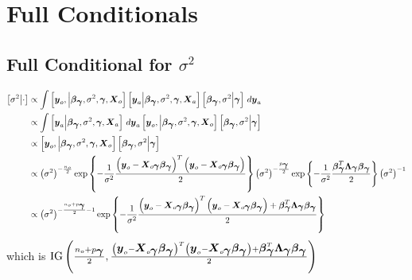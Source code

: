 \documentclass[fleqn]{article}
\def\bm#1{\mbox{\boldmath $#1$}}
\begin{document}
\section{Full Conditionals}
\subsection{Full Conditional for $\sigma^2$}
%
\begin{align*}
%
\left[ \sigma^2 \middle| \cdot \right] & \propto \int \left[ \bm{y}_o, \middle| \bm{\beta}_{\bm{\gamma}}, \sigma^2, \bm{\gamma}, \bm{X}_o \right] \left[ \bm{y}_a \middle| \bm{\beta}_{\bm{\gamma}}, \sigma^2, \bm{\gamma}, \bm{X}_a \right] \left[ \bm{\beta}_{\bm{\gamma}}, \sigma^2 \middle| \bm{\gamma} \right] \, d \bm{y}_a\\
%
 & \propto \int \left[ \bm{y}_a \middle| \bm{\beta}_{\bm{\gamma}}, \sigma^2, \bm{\gamma}, \bm{X}_a \right] \, d \bm{y}_a \left[ \bm{y}_o, \middle| \bm{\beta}_{\bm{\gamma}}, \sigma^2, \bm{\gamma}, \bm{X}_o \right] \left[ \bm{\beta}_{\bm{\gamma}}, \sigma^2 \middle| \bm{\gamma} \right] \\
%
 & \propto \left[ \bm{y}_o, \middle| \bm{\beta}_{\bm{\gamma}}, \sigma^2, \bm{\gamma}, \bm{X}_o \right] \left[ \bm{\beta}_{\bm{\gamma}}, \sigma^2 \middle| \bm{\gamma} \right] \\
%
 & \propto \left( \sigma^2 \right)^{ - \frac{n_o} {2}} \exp{\left\{ - \frac{1} {\sigma^2} \frac{ \left( \bm{y}_o - \bm{X}_{o \bm{\gamma}} \bm{\beta}_{\bm{\gamma}} \right)^T \left( \bm{y}_o - \bm{X}_{o \bm{\gamma}} \bm{\beta}_{\bm{\gamma}} \right) } {2} \right\} } \left( \sigma^2 \right)^{ - \frac{p_{\bm{\gamma}}} {2}} \exp{ \left\{ - \frac{1} {\sigma^2} \frac{\bm{\beta}_{\bm{\gamma}}^T \bm{\Lambda}_{\bm{\gamma}} \bm{\beta}_{\bm{\gamma}}} {2} \right\} } \left( \sigma^2 \right)^{ - 1}\\
%
 & \propto \left( \sigma^2 \right)^{ - \frac{n_o + p_{\bm{\gamma}}} {2} - 1} \exp{\left\{ - \frac{1} {\sigma^2} \frac{ \left( \bm{y}_o - \bm{X}_{o \bm{\gamma}} \bm{\beta}_{\bm{\gamma}} \right)^T \left( \bm{y}_o - \bm{X}_{o \bm{\gamma}} \bm{\beta}_{\bm{\gamma}} \right) + \bm{\beta}_{\bm{\gamma}}^T \bm{\Lambda}_{\bm{\gamma}} \bm{\beta}_{\bm{\gamma}} } {2} \right\} } 
%
\end{align*}
%
which is $\mbox{IG} \left( \frac{n_o + p_{\bm{\gamma}}} {2}, \frac{\left( \bm{y}_o - \bm{X}_{o \bm{\gamma}} \bm{\beta}_{\bm{\gamma}} \right)^T \left( \bm{y}_o - \bm{X}_{o \bm{\gamma}} \bm{\beta}_{\bm{\gamma}} \right) + \bm{\beta}_{\bm{\gamma}}^T \bm{\Lambda}_{\bm{\gamma}} \bm{\beta}_{\bm{\gamma}}} {2} \right)$
\end{document}
